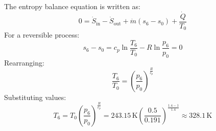 The entropy balance equation is written as:  
\[
0 = \dot{S}_{\text{in}} - \dot{S}_{\text{out}} + \dot{m} \left( s_6 - s_0 \right) + \frac{\dot{Q}}{T_0}
\]  
For a reversible process:  
\[
s_6 - s_0 = c_p \ln \frac{T_6}{T_0} - R \ln \frac{p_6}{p_0} = 0
\]  
Rearranging:  
\[
\frac{T_6}{T_0} = \left( \frac{p_6}{p_0} \right)^{\frac{R}{c_p}}
\]  
Substituting values:  
\[
T_6 = T_0 \left( \frac{p_6}{p_0} \right)^{\frac{R}{c_p}} = 243.15 \, \text{K} \left( \frac{0.5}{0.191} \right)^{\frac{1.4 - 1}{1.4}} \approx 328.1 \, \text{K}
\]
